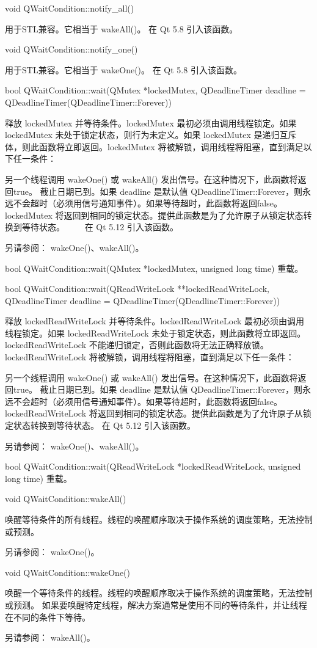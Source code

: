 void QWaitCondition::notify\_all()

用于STL兼容。它相当于 wakeAll()。
在 Qt 5.8 引入该函数。

void QWaitCondition::notify\_one()

用于STL兼容。它相当于 wakeOne()。
在 Qt 5.8 引入该函数。

bool QWaitCondition::wait(QMutex *lockedMutex, QDeadlineTimer deadline = QDeadlineTimer(QDeadlineTimer::Forever))

释放 lockedMutex 并等待条件。lockedMutex 最初必须由调用线程锁定。如果 lockedMutex 未处于锁定状态，则行为未定义。如果 lockedMutex 是递归互斥体，则此函数将立即返回。lockedMutex 将被解锁，调用线程将阻塞，直到满足以下任一条件：

另一个线程调用 wakeOne() 或 wakeAll() 发出信号。在这种情况下，此函数将返回true。
截止日期已到。如果 deadline 是默认值 QDeadlineTimer::Forever，则永远不会超时（必须用信号通知事件）。如果等待超时，此函数将返回false。
lockedMutex 将返回到相同的锁定状态。提供此函数是为了允许原子从锁定状态转换到等待状态。   在 Qt 5.12 引入该函数。

另请参阅： wakeOne()、wakeAll()。

bool QWaitCondition::wait(QMutex *lockedMutex, unsigned long time)
重载。

bool QWaitCondition::wait(QReadWriteLock **lockedReadWriteLock, QDeadlineTimer deadline = QDeadlineTimer(QDeadlineTimer::Forever))

释放 lockedReadWriteLock 并等待条件。lockedReadWriteLock 最初必须由调用线程锁定。如果 lockedReadWriteLock 未处于锁定状态，则此函数将立即返回。 lockedReadWriteLock 不能递归锁定，否则此函数将无法正确释放锁。lockedReadWriteLock 将被解锁，调用线程将阻塞，直到满足以下任一条件：

另一个线程调用 wakeOne() 或 wakeAll() 发出信号。在这种情况下，此函数将返回true。
截止日期已到。如果 deadline 是默认值 QDeadlineTimer::Forever，则永远不会超时（必须用信号通知事件）。如果等待超时，此函数将返回false。
lockedReadWriteLock 将返回到相同的锁定状态。提供此函数是为了允许原子从锁定状态转换到等待状态。
在 Qt 5.12 引入该函数。

另请参阅： wakeOne()、wakeAll()。

bool QWaitCondition::wait(QReadWriteLock *lockedReadWriteLock, unsigned long time)
重载。

void QWaitCondition::wakeAll()

唤醒等待条件的所有线程。线程的唤醒顺序取决于操作系统的调度策略，无法控制或预测。

另请参阅： wakeOne()。

void QWaitCondition::wakeOne()

唤醒一个等待条件的线程。线程的唤醒顺序取决于操作系统的调度策略，无法控制或预测。
如果要唤醒特定线程，解决方案通常是使用不同的等待条件，并让线程在不同的条件下等待。

另请参阅： wakeAll()。

